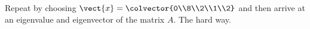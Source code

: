 Repeat  by choosing $\vect{x}=\colvector{0\\8\\2\\1\\2}$ and then arrive at an eigenvalue and eigenvector of the matrix $A$.  The hard way.